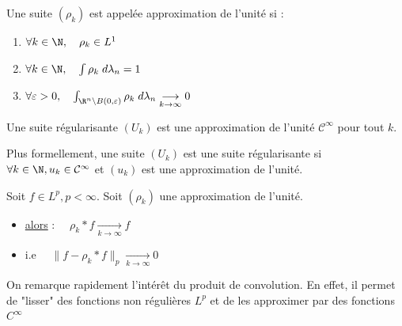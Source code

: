\begin{definition}
    Une suite $(\rho_k)$ est appelée approximation de l'unité si :
    \begin{enumerate}
        \item $ \forall k \in \N, \quad \rho_k \in {L}^1$ 
        \item $ \forall k \in \N, \quad \int \rho_k \; d \lambda_n = 1 $
        \item $ \forall \varepsilon > 0, \quad \int_{\R^n \backslash B(0,\varepsilon)} \rho_k \; d \lambda_n \underset{k \to \infty}{\longrightarrow} 0 $
    \end{enumerate}
\end{definition}

\begin{definition}
    Une suite régularisante $(U_k)$ est une approximation de l'unité $\mathcal{C}^\infty$ pour tout $k$. 
    \vspace{0.5cm}

    Plus formellement, une suite $(U_k)$ est une suite régularisante si $ \forall k \in \N, u_k \in \mathcal{C}^\infty$ 
    et $(u_k)$ est une approximation de l'unité. 
\end{definition}

\begin{theorem}
    Soit $f \in {L}^p, p < \infty$. Soit $(\rho_k)$ une approximation de l'unité. 
    \begin{itemize}
        \item[]\underline{alors} : $ \quad \rho_k \ast f \underset{k \to \infty}{\longrightarrow} f$ 
        \item[]i.e $ \quad  \|  f - \rho_k \ast f \|_p \underset{k \to \infty}{\longrightarrow} 0$ 
    \end{itemize}
\end{theorem}

\begin{remark}
    On remarque rapidement l'intérêt du produit de convolution. 
    En effet, il permet de "lisser" des fonctions non régulières $L^p$ et de les approximer 
    par des fonctions $C^\infty$ 
\end{remark}